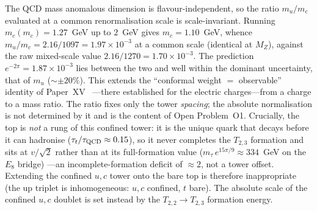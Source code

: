 \begin{remark}
\label{P20:rem:up_ratio_data}
The QCD mass anomalous dimension is flavour-independent, so the ratio
$m_u/m_c$ evaluated at a common renormalisation scale is scale-invariant.
Running $m_c(m_c)=1.27$~GeV up to $2$~GeV gives $m_c=1.10$~GeV, whence
$m_u/m_c=2.16/1097=1.97\times10^{-3}$ at a common scale (identical at $M_Z$),
against the raw mixed-scale value $2.16/1270=1.70\times10^{-3}$. The
prediction $e^{-2\pi}=1.87\times10^{-3}$ lies between the two and well within
the dominant uncertainty, that of $m_u$ ($\sim\pm20\%$). This extends the
``conformal weight $=$ observable'' identity of Paper~XV~\cite{Paper15}
---there established for the electric charges---from a charge to a mass ratio.
The ratio fixes only the tower \emph{spacing}; the absolute normalisation is
not determined by it and is the content of Open Problem~O1. Crucially, the top
is \emph{not} a rung of this confined tower: it is the unique quark that decays
before it can hadronise ($\tau_t/\tau_{\rm QCD}\approx0.15$), so it never
completes the $T_{2,3}$ formation and sits at $v/\sqrt2$ rather than at its
full-formation value ($m_\tau\,e^{15\pi/9}\approx334$~GeV on the $E_8$ bridge)
---an incomplete-formation deficit of $\approx2$, not a tower offset.
Extending the confined
$u,c$ tower onto the bare top is therefore inappropriate (the up triplet is
inhomogeneous: $u,c$ confined, $t$ bare). The absolute scale of the confined
$u,c$ doublet is set instead by the $T_{2,2}\!\to\!T_{2,3}$ formation energy.
\end{remark}

